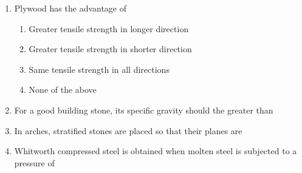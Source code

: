 \documentclass[11pt,a4paper]{article}
\begin{document}
\begin{enumerate}
{(iv) Low tensile strength}
\\
\item{Plywood has the advantage of}
\begin{enumerate}[label=\Alph*.]
\item{Greater tensile strength in longer direction}
\item{Greater tensile strength in shorter direction}
\item{Same tensile strength in all directions}
\item{None of the above}
\end{enumerate}
\item{For a good building stone, its specific gravity should the greater than}
\\
\item{In arches, stratified stones are placed so that their planes are}
\\
\item{Whitworth compressed steel is obtained when molten steel is subjected to a pressure of}
\\

\end{enumerate}
\end{document}
